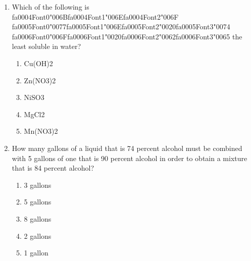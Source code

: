 \documentclass[12pt]{article}
\begin{document}
\begin{enumerate}[label=\arabic*.]
explains why?
\begin{enumerate}[label=(\alph*)]
    \item Transition metals will gain their outermost s-block electrons when forming bonds.
    \item Transition metals tend to gain electrons when reacting with other elements.
    \item Transition metals tend to lose electrons when reacting with other elements.
    \item Transition metals all have a minimum of two unpaired electrons.
    \item Transition metals have a maximum of two unpaired electrons.
\end{enumerate}
\item Which of the following is {\csname fa0004Font0\endcsname\char"006B}{\csname fa0004Font1\endcsname\char"006E}{\csname fa0004Font2\endcsname\char"006F} {\csname fa0005Font0\endcsname\char"0077}{\csname fa0005Font1\endcsname\char"006E}{\csname fa0005Font2\endcsname\char"0020}{\csname fa0005Font3\endcsname\char"0074} {\csname fa0006Font0\endcsname\char"006F}{\csname fa0006Font1\endcsname\char"0020}{\csname fa0006Font2\endcsname\char"0062}{\csname fa0006Font3\endcsname\char"0065} the least soluble in water?
\begin{enumerate}[label=(\alph*)]
    \item Cu(OH)2
    \item Zn(NO3)2
    \item NiSO3
    \item MgCl2
    \item Mn(NO3)2
\end{enumerate}
\item How many gallons of a liquid that is 74 percent alcohol must be combined with 5 gallons of
one that is 90 percent alcohol in order to obtain a mixture that is 84 percent alcohol?
\begin{enumerate}[label=(\alph*)]
    \item 3 gallons
    \item 5 gallons
    \item 8 gallons
    \item 2 gallons
    \item 1 gallon
\end{enumerate}
\end{enumerate}
\end{document}
